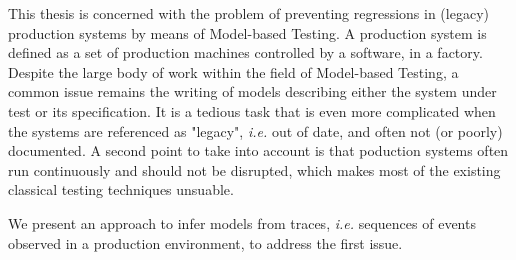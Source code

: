 This thesis is concerned with the problem of preventing
regressions in (legacy) production systems by means of
Model-based Testing. A production system is defined as a set of
production machines controlled by a software, in a factory.
Despite the large body of work within the field of Model-based
Testing, a common issue remains the writing of models describing
either the system under test or its specification. It is a
tedious task that is even more complicated when the systems are
referenced as "legacy", \emph{i.e.} out of date, and often not
(or poorly) documented. A second point to take into account is
that poduction systems often run continuously and should not be
disrupted, which makes most of the existing classical testing
techniques unsuable.

We present an approach to infer models from traces, \emph{i.e.}
sequences of events observed in a production environment, to
address the first issue.

